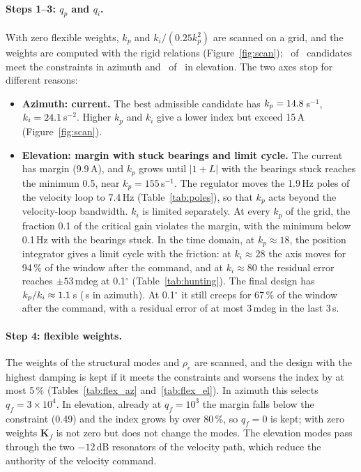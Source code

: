 \documentclass[10pt,a4paper]{article}
\numberwithin{equation}{section}
\begin{document}
\paragraph{Steps 1--3: $q_p$ and $q_i$.} With zero flexible weights, $k_p$ and $k_i/(0.25k_p^2)$ are scanned on a grid, and the weights are computed with the rigid relations (Figure~\ref{fig:scan}); \nOkA\ of \nScanA\ candidates meet the constraints in azimuth and \nOkP\ of \nScanP\ in elevation. The two axes stop for different reasons:
\begin{itemize}
\item \textbf{Azimuth: current.} The best admissible candidate has $k_p=14.8$\,s$^{-1}$, $k_i=24.1$\,s$^{-2}$. Higher $k_p$ and $k_i$ give a lower index but exceed 15\,A (Figure~\ref{fig:scan}).
\item \textbf{Elevation: margin with stuck bearings and limit cycle.} The current has margin (9.9\,A), and $k_p$ grows until $|1+L|$ with the bearings stuck reaches the minimum 0.5, near $k_p=155$\,s$^{-1}$. The regulator moves the 1.9\,Hz poles of the velocity loop to 7.4\,Hz (Table~\ref{tab:poles}), so that $k_p$ acts beyond the velocity-loop bandwidth. $k_i$ is limited separately. At every $k_p$ of the grid, the fraction 0.1 of the critical gain violates the margin, with the minimum below 0.1\,Hz with the bearings stuck. In the time domain, at $k_p\approx18$, the position integrator gives a limit cycle with the friction: at $k_i\approx28$ the axis moves for 94\,\% of the window after the command, and at $k_i\approx80$ the residual error reaches $\pm53$\,mdeg at 0.1$^\circ$ (Table~\ref{tab:hunting}). The final design has $k_p/k_i\approx1.1$\,s (\tauIA\,s in azimuth). At 0.1$^\circ$ it still creeps for 67\,\% of the window after the command, with a residual error of at most 3\,mdeg in the last 3\,s.
\end{itemize}

\paragraph{Step 4: flexible weights.} The weights of the structural modes and $\rho_e$ are scanned, and the design with the highest damping is kept if it meets the constraints and worsens the index by at most 5\,\% (Tables~\ref{tab:flex_az} and~\ref{tab:flex_el}). In azimuth this selects $q_f=3\times10^4$. In elevation, already at $q_f=10^3$ the margin falls below the constraint (0.49) and the index grows by over 80\,\%, so $q_f=0$ is kept; with zero weights $\mathbf K_f$ is not zero but does not change the modes. The elevation modes pass through the two $-12$\,dB resonators of the velocity path, which reduce the authority of the velocity command.
\end{document}
